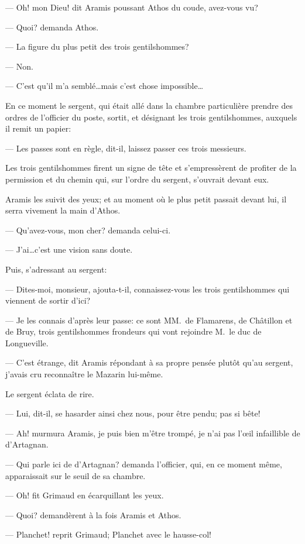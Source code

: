 — Oh! mon Dieu! dit Aramis poussant Athos du coude, avez-vous vu?

— Quoi? demanda Athos.

— La figure du plus petit des trois gentilshommes?

— Non.

— C'est qu'il m'a semblé\dots mais c'est chose impossible\dots

En ce moment le sergent, qui était allé dans la chambre particulière prendre des ordres de l'officier du poste, sortit, et désignant les trois gentilshommes, auxquels il remit un papier:

— Les passes sont en règle, dit-il, laissez passer ces trois messieurs.

Les trois gentilshommes firent un signe de tête et s'empressèrent de profiter de la permission et du chemin qui, sur l'ordre du sergent, s'ouvrait devant eux.

Aramis les suivit des yeux; et au moment où le plus petit passait devant lui, il serra vivement la main d'Athos.

— Qu'avez-vous, mon cher? demanda celui-ci.

— J'ai\dots c'est une vision sans doute.

Puis, s'adressant au sergent:

— Dites-moi, monsieur, ajouta-t-il, connaissez-vous les trois gentilshommes qui viennent de sortir d'ici?

— Je les connais d'après leur passe: ce sont MM.~de Flamarens, de Châtillon et de Bruy, trois gentilshommes frondeurs qui vont rejoindre M.~le duc de Longueville.

— C'est étrange, dit Aramis répondant à sa propre pensée plutôt qu'au sergent, j'avais cru reconnaître le Mazarin lui-même.

Le sergent éclata de rire.

— Lui, dit-il, se hasarder ainsi chez nous, pour être pendu; pas si bête!

— Ah! murmura Aramis, je puis bien m'être trompé, je n'ai pas l'œil infaillible de d'Artagnan.

— Qui parle ici de d'Artagnan? demanda l'officier, qui, en ce moment même, apparaissait sur le seuil de sa chambre.

— Oh! fit Grimaud en écarquillant les yeux.

— Quoi? demandèrent à la fois Aramis et Athos.

— Planchet! reprit Grimaud; Planchet avec le hausse-col!

